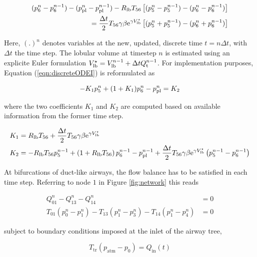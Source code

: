 \begin{equation}
\begin{split} \label{eqn:discreteODEI}
(p_6^n - p_6^{n-1}) - (p_{\mathrm{pl}}^n - p_{\mathrm{pl}}^{n-1}) - R_{\mathrm{lb}} T_{56} \left[ (p_5^n - p_5^{n-1}) - (p_6^n - p_6^{n-1})\right] \\
= \frac{\Delta t}{2}T_{56}\gamma\beta\mathrm{e}^{\gamma V_{\mathrm{lb}}^\star}\left[ (p_5^n + p_5^{n-1}) - (p_6^n + p_6^{n-1})\right]
\end{split}
\end{equation}

Here, $(.)^n$ denotes variables at the new, updated, discrete time $t = n\Delta t$, with $\Delta t$ the time step.
The lobular volume at timestep $n$ is estimated using an explicite Euler formulation $V_{\mathrm{lb}}^\star = V_{\mathrm{lb}}^{n-1} + \Delta t Q_{\mathrm{t}}^{n-1}$.
For implementation purposes, Equation (\ref{eqn:discreteODEI}) is reformulated as

\begin{equation} \label{eqn:discreteODEII}
  -K_1 p_5^n + (1 + K_1) p_6^n - p_{\mathrm{pl}}^n = K_2
\end{equation}

where the two coefficients $K_1$ and $K_2$ are computed based on available information from the former time step.

\begin{align}
  K_1 &= R_{\mathrm{lb}} T_{56} + \frac{\Delta t}{2}T_{56}\gamma\beta\mathrm{e}^{\gamma V_{\mathrm{lb}}^\star} \\
  K_2 &= -R_{\mathrm{lb}} T_{56} p_5^{n-1} + \left( 1 + R_{\mathrm{lb}} T_{56}\right) p_6^{n-1} - p_{\mathrm{pl}}^{n-1} + \frac{\Delta t}{2}T_{56}\gamma\beta\mathrm{e}^{\gamma V_{\mathrm{lb}}^\star}\left( p_5^{n-1} - p_6^{n-1}\right)
\end{align}

At bifurcations of duct-like airways, the flow balance has to be satisfied in each time step.
Referring to node $1$ in Figure \ref{fig:network} this reads

\begin{equation} \label{eqn:flowBalance}
\begin{split}
Q_{01}^n - Q_{13}^n - Q_{14}^n &= 0 \\
T_{01}(p_0^n - p_1^n) - T_{13}(p_1^n - p_3^n) - T_{14}(p_1^n - p_4^n) &= 0
\end{split}
\end{equation}

subject to boundary conditions imposed at the inlet of the airway tree,

\begin{equation}
T_\mathrm{tr}(p_\mathrm{atm} - p_0) = Q_\mathrm{in}(t)
\end{equation}

